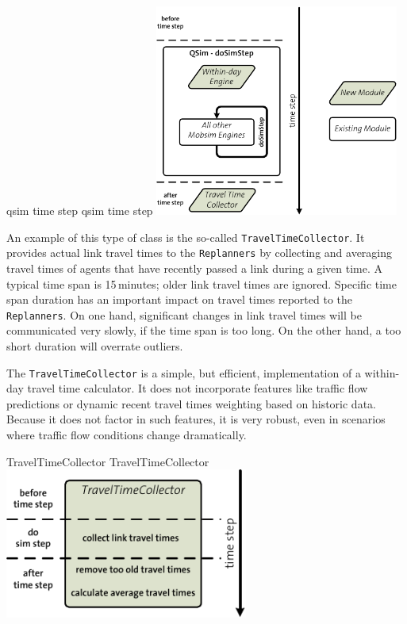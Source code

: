 \createfigure%
{\protect\gls{qsim} time step}%
{\protect\gls{qsim} time step}%
{\label{fig:labelQSimTimeStep}}%
{\includegraphics[width=8.0cm, angle=0]{extending/figures/WithinDayReplanning/QSimTimeStep}}%
{}
%

An example of this type of class is the so-called \lstinline{TravelTimeCollector}. It provides actual link travel times to the \lstinline{Replanners} by collecting and averaging travel times of agents that have recently passed a link during a given time. A typical time span is 15\,minutes; older link travel times are ignored. Specific time span duration has an important impact on travel times reported to the \lstinline{Replanners}. On one hand, significant changes in link travel times will be communicated very slowly, if the time span is too long. On the other hand, a too short duration will overrate outliers.

The \lstinline{TravelTimeCollector} is a simple, but efficient, implementation of a within-day travel time calculator. It does not incorporate features like traffic flow predictions or dynamic recent travel times weighting based on historic data. 
Because it does not factor in such features, it is very robust, even in scenarios where traffic flow conditions change dramatically.

\createfigure%
{TravelTimeCollector}%
{TravelTimeCollector}%
{\label{fig:labelTravelTimeCollector}}%
{\includegraphics[width=8.0cm, angle=0]{extending/figures/WithinDayReplanning/TravelTimeCollector}}%
{}
%

